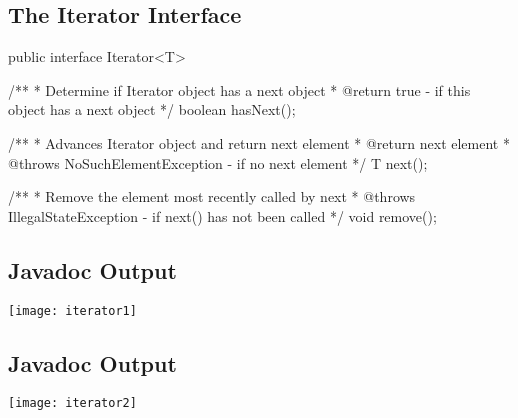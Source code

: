 
\begin{slide}
\section[-1]{The Iterator Interface}

\begin{java}
public interface Iterator<T>
{
  /**
   * Determine if Iterator object has a next object
   * @return true - if this object has a next object
   */
   boolean hasNext();

   /**
    * Advances Iterator object and return next element
    * @return next element
    * @throws NoSuchElementException - if no next element
    */
    T next();

   /**
    * Remove the element most recently called by next
    * @throws IllegalStateException - if next() has not been called
    */
    void remove();
}
\end{java}\vspace{-1cm}
\end{slide}


\begin{slide}
\section[-2]{Javadoc Output}

\begin{center}
  \texttt{[image: iterator1]}\vspace*{-2cm}
\end{center}
\end{slide}


\begin{slide}
\section[-2]{Javadoc Output}

\begin{center}
  \texttt{[image: iterator2]}\vspace*{-2cm}
\end{center}
\end{slide}

